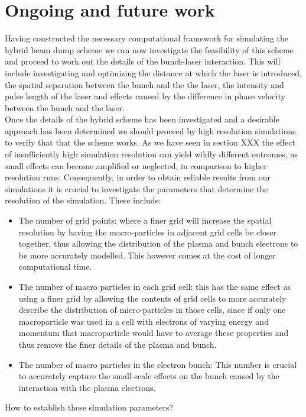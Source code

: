 \chapter{Ongoing and future work}
Having constructed the necessary computational framework for simulating the hybrid beam dump scheme we can now investigate the feasibility of this scheme and proceed to work out the details of the bunch-laser interaction. This will include investigating and optimizing the distance at which   the laser is introduced, the spatial separation between the bunch and the the laser, the intensity and pulse length of the laser and effects caused by the difference in phase velocity between the bunch and the laser.\\
Once the details of the hybrid scheme has been investigated and a desirable approach has been determined we should proceed by high resolution simulations to verify that that the scheme works. As we have seen in section XXX the effect of insufficiently high simulation resolution can yield wildly different outcomes, as small effects can become amplified or neglected, in comparison to higher resolution runs. Consequently, in order to obtain reliable results from our simulations it is crucial to investigate the parameters that determine the resolution of the simulation. These include:
\begin{itemize}
\item The number of grid points: where a finer grid will increase the spatial resolution by having the macro-particles in adjacent grid cells be closer together, thus allowing the distribution of the plasma and bunch electrons to be more accurately modelled. This however comes at the cost of longer computational time.
\item The number of macro particles in each grid cell: this has the same effect as using a finer grid by allowing the contents of grid cells to more accurately describe the distribution of micro-particles in those cells, since if only one macroparticle was used in a cell with electrons of varying energy and momentum that macroparticle would have to average these properties and thus remove the finer details of the plasma and bunch.
\item The number of macro particles in the electron bunch: This number is crucial to accurately capture the small-scale effects on the bunch caused by the interaction with the plasma electrons. 
\end{itemize}
How to establish these simulation parameters?\\

